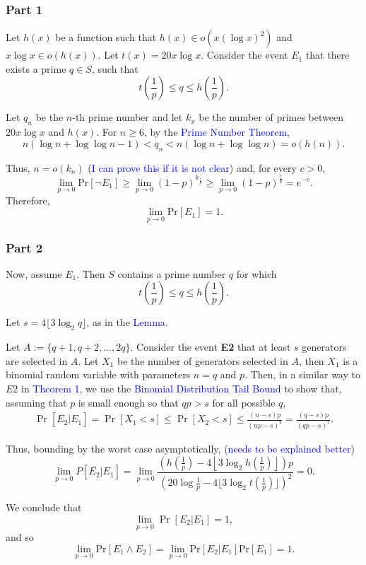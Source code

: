 \subsubsection*{Part 1}
Let \(h(x)\) be a function such that \(h(x) \in o(x (\log x)^2)\) and \(x\log x \in o(h(x))\). Let $t(x) = 20x \log x$. Consider the event
$E_1$ that there exists a prime $q \in S$, such that 
\[t\left(\frac{1}{p}\right) \leq q \leq h\left(\frac{1}{p}\right).\]
\par 
Let $q_n$ be the $n$-th prime number and let $k_x$ be the number of primes between $20x\log x$ and $h(x)$. For $n \geq 6$, by the \textcolor{blue}{Prime Number Theorem}, 
\[n(\log n + \log \log n - 1) < q_n < n(\log n + \log\log n) = o(h(n)).\]

\par Thus, $n = o(k_n)$ (\textcolor{blue}{I can prove this if it is not clear}) and, for every $c > 0$,  
\[\lim_{p \to 0}\text{Pr}[\lnot E_1] \geq \lim_{p \to 0} (1 - p)^{k_{\frac{1}{p}}} \geq \lim_{p \to 0} (1 - p)^{\frac{c}{p}} = e^{-c}.\]
Therefore, 
\[\lim_{p \to 0}\text{Pr}[E_1] = 1.\]
\subsubsection*{Part 2}

Now, assume $E_1$. Then $S$ contains a prime number $q$ for which 
\[t\left(\frac{1}{p}\right) \leq q \leq h\left(\frac{1}{p}\right).\]
\par Let $s = 4\lfloor3\log_2 q \rfloor$, as in the \textcolor{blue}{Lemma}. 
\par Let $A := \{q + 1, q + 2, \ldots,  2q\}$. Consider the event \textbf{E2} that at least $s$ generators are selected in $A$. Let $X_1$ be the number of generators selected in $A$, then $X_1$ is a binomial random variable with parameters $n = q$ and $p$. Then, in a similar way to $E2$ in \textcolor{blue}{Theorem 1}, we use the \textcolor{blue}{Binomial Distribution Tail Bound} to show that, assuming that $p$ is small enough so that $qp > s$ for all possible $q$,
\begin{align*}
    \Pr[ \overline{E_2}  | E_1] = \Pr\left[X_1 < s\right] \leq \Pr\left[X_2 < s\right] \leq \frac{(n - s)p}{(np - s)^2} = \frac{(q - s)p}{(qp - s)^2}.
\end{align*}
\par Thus, bounding by the worst case asymptotically, (\textcolor{blue}{needs to be explained better})
\[\lim_{p \to 0} P[\overline{E_2} | E_1] =  \lim_{p \to 0}\frac{\left(h\left(\frac{1}{p}\right) - 4\left\lfloor3\log_2 h\left(\frac{1}{p}\right) \right\rfloor\right)p}{\left(20 \log \frac{1}{p} - 4\lfloor3\log_2 t\left(\frac{1}{p}\right) \rfloor\right)^2} = 0.\]
\par We conclude that
\[\lim_{p \to 0} \Pr[E_2 | E_1] = 1,\]
and so
\[\lim_{p \to 0} \text{Pr}[E_1 \land E_2] = \lim_{p \to 0} \text{Pr}[E_2  | E_1]\text{Pr}[E_1] = 1.\]


